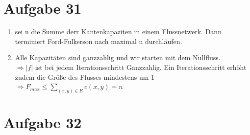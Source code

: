 \documentclass[10pt,a4paper]{article}
\begin{document}
\section*{Aufgabe 31}

    \begin{enumerate}[label={\alph*)}]
        \item 
            sei n die Summe derr Kantenkapaziten in einem Flussnetwerk.
            Dann terminiert Ford-Fulkerson nach maximal n durchläufen.
        \item
            Alle Kapazitäten sind ganzzahlig und wir starten mit dem Nullfluss. \\
            $\Rightarrow |f|$ ist bei jedem Iterationsschritt Ganzzahlig.
            Ein Iterationsschritt erhöht zudem die Größe des Flusses mindestens um 1\\
            $\Rightarrow F_{max} \leq \sum_{(x,y) \in E} c(x,y) = n$
    \end{enumerate}


\section*{Aufgabe 32}
\end{document}
